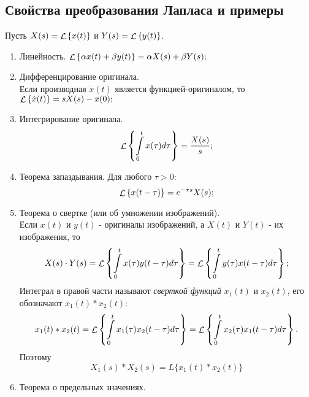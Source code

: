 \documentclass[../../TAU.tex]{subfiles}
\begin{document}
\subsection{Свойства преобразования Лапласа и примеры} %
    Пусть 
    $X(s) = \mathop{\mathcal{L}}\nolimits\left\{x(t)\right\}$ и 
    $Y(s) = \mathop{\mathcal{L}}\nolimits\left\{y(t)\right\}$.
    \begin{enumerate}
        \item Линейность. $\mathop{\mathcal{L}}\nolimits\left\{\alpha x(t) + \beta y(t)\right\} = \alpha X(s) + \beta Y(s);$
        \item Дифференцирование оригинала. \\
            Если производная 
            $\dot x(t)$ 
            является функцией-оригиналом, то 
            $\mathop{\mathcal{L}}\nolimits\left\{\dot x(t)\right\} = sX(s) - x(0);$
        \item Интегрирование оригинала.
            \begin{equation}
                \mathop{\mathcal{L}}\nolimits\left\{\int\limits_0^tx(\tau)d\tau\right\} = \frac{X(s)}{s};
            \end{equation}
        \item Теорема запаздывания. Для любого $\tau>0$:
            \begin{equation}
                \mathop{\mathcal{L}}\nolimits\left\{x(t-\tau)\right\} = e^{-\tau s}X(s);
            \end{equation}
        \item  Теорема о свертке (или об умножении изображений).\\
            Если $x(t)$ и $y(t)$ - оригиналы изображений, а $X(t)$ и $Y(t)$ - их изображения, то
            \begin{equation}
                X(s)\cdot Y(s) = \mathop{\mathcal{L}}\nolimits\left\{\int\limits_0^tx(\tau)y(t-\tau)d\tau\right\} = \mathop{\mathcal{L}}\nolimits\left\{\int\limits_0^ty(\tau)x(t-\tau)d\tau\right\};
            \end{equation}
            Интеграл в правой части называют {\it сверткой функций} $x_1(t)$ и $x_2(t)$, его обозначают $x_1(t) * x_2(t)$:
            \begin{equation}
                x_1(t)*x_2(t) = \mathop{\mathcal{L}}\nolimits\left\{\int\limits_0^t x_1(\tau) x_2(t-\tau) d{\tau}\right\} = \mathop{\mathcal{L}}\nolimits\left\{\int\limits_0^t x_2(\tau) x_1(t-\tau)d\tau\right\}.
            \end{equation}
            Поэтому 
            \begin{equation}
                X_1(s) * X_2(s) = L\{x_1(t) * x_2(t)\}
            \end{equation}
        \item Теорема о предельных значениях.
            \begin{enumerate}[label*={\arabic*}]

\end{enumerate}
\end{enumerate}
\end{document}
